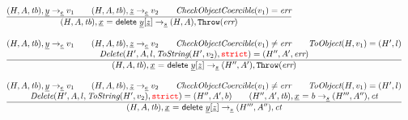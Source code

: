 \documentclass[a4paper, leqno]{amsart}
\newcommand{\rulesep}{\quad\quad}
\newcommand{\stmt}{s}
\newcommand{\expr}{e}
\newcommand{\ir}[1]{\ensuremath{\underline{#1}}}
\newcommand{\irid}{\ir{x}}
\def\inred{\color{red}}
\newcommand{\strict}{{\inred\tt strict}}
\newcommand{\tb}{\emph{tb}}
\newcommand{\err}{\emph{err}}
\newcommand{\ct}{\emph{ct}}
\newcommand{\hf}[1]{\emph{#1}}
\newcommand{\error}{\ensuremath{{\tt Throw}(\err)}}
\newcommand{\state}{\ensuremath{(H,A,\tb)}}
\newcommand{\res}{\ensuremath{(H,A)}}
\newcommand{\evale}{\ensuremath{(H,A,\tb)}}
\newcommand{\irdelprop}{\ensuremath{\irid \ {\tt =} \ {\sf delete}\ \ir{y}{\tt[}\ir{z}{\tt]}}}
\def\inred{\color{red}}
\begin{document}
\[\begin{array}{l@{~~}l@{~~}ll}
\frac{\begin{matrix}
\evale, \ir{y} \rightarrow_{\ir\expr} v_1
\rulesep
\evale, \ir{z} \rightarrow_{\ir\expr} v_2
\rulesep
\hf{CheckObjectCoercible}(v_1) = \err
\end{matrix}}{\begin{matrix}
\state, \irdelprop \rightarrow_{\ir\stmt} \res, \error
\end{matrix}}
\\[2em]

\frac{\begin{matrix}
\evale, \ir{y} \rightarrow_{\ir\expr} v_1
\rulesep
\evale, \ir{z} \rightarrow_{\ir\expr} v_2
\rulesep
\hf{CheckObjectCoercible}(v_1) \not= \err
\rulesep
\hf{ToObject}(H, v_1) = (H',l)
\\
\hf{Delete}(H', A, l, \hf{ToString}(H',v_2), \strict) = (H'', A', \err)
\end{matrix}}{\begin{matrix}
\state, \irdelprop \rightarrow_{\ir\stmt} (H'',A'), \error
\end{matrix}}
\\\\

\frac{\begin{matrix}
\evale, \ir{y} \rightarrow_{\ir\expr} v_1
\rulesep
\evale, \ir{z} \rightarrow_{\ir\expr} v_2
\rulesep
\hf{CheckObjectCoercible}(v_1) \not= \err
\rulesep
\hf{ToObject}(H, v_1) = (H',l)
\\
\hf{Delete}(H', A, l, \hf{ToString}(H',v_2), \strict) = (H'', A', b)
\rulesep
(H'',A',\tb), \irid \ {\tt =} \ b \rightarrow_{\ir\stmt} (H''',A''), \ct
\end{matrix}}{\begin{matrix}
\state, \irdelprop \rightarrow_{\ir\stmt} (H''',A''), \ct
\end{matrix}}

\\[2em]

\end{array}
\]
\end{document}
